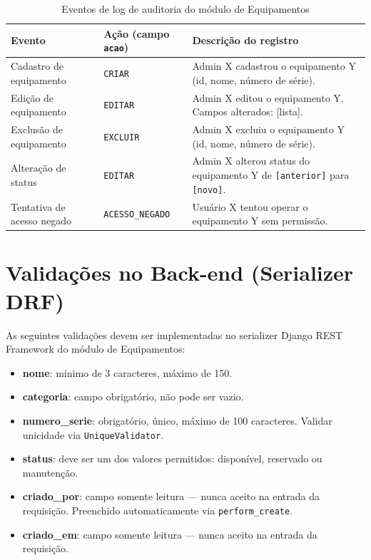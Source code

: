 \documentclass[12pt, a4paper]{article}
\begin{document}
\begin{table}[H]
\centering
\small
\begin{tabular}{L{3.4cm} L{3.1cm} L{6.5cm}}
  \toprule
  \textbf{Evento}                 & \textbf{Ação (campo \texttt{acao})} & \textbf{Descrição do registro} \\
  \midrule

  Cadastro de equipamento
    & \texttt{CRIAR}
    & Admin X cadastrou o equipamento Y (id, nome, número de série). \\
  \addlinespace

  Edição de equipamento
    & \texttt{EDITAR}
    & Admin X editou o equipamento Y. Campos alterados: [lista]. \\
  \addlinespace

  Exclusão de equipamento
    & \texttt{EXCLUIR}
    & Admin X excluiu o equipamento Y (id, nome, número de série). \\
  \addlinespace

  Alteração de status
    & \texttt{EDITAR}
    & Admin X alterou status do equipamento Y de \texttt{[anterior]} para \texttt{[novo]}. \\
  \addlinespace

  Tentativa de acesso negado
    & \texttt{ACESSO\_NEGADO}
    & Usuário X tentou operar o equipamento Y sem permissão. \\

  \bottomrule
\end{tabular}
\caption{Eventos de log de auditoria do módulo de Equipamentos}
\end{table}

\section{Validações no Back-end (Serializer DRF)}

As seguintes validações devem ser implementadas no serializer Django REST Framework
do módulo de Equipamentos:

\begin{itemize}
  \item \textbf{nome}: mínimo de 3 caracteres, máximo de 150.
  \item \textbf{categoria}: campo obrigatório, não pode ser vazio.
  \item \textbf{numero\_serie}: obrigatório, único, máximo de 100 caracteres. Validar
        unicidade via \texttt{UniqueValidator}.
  \item \textbf{status}: deve ser um dos valores permitidos: disponível, reservado
        ou manutenção.
  \item \textbf{criado\_por}: campo somente leitura — nunca aceito na entrada da
        requisição. Preenchido automaticamente via \texttt{perform\_create}.
  \item \textbf{criado\_em}: campo somente leitura — nunca aceito na entrada da
        requisição.
\end{itemize}
\end{document}
